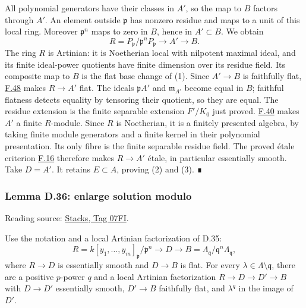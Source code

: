 \documentclass[11pt,a4paper,openany]{report}
\begin{document}
All polynomial generators have their classes in \(A'\), so the map to \(B\) factors through \(A'\). An element outside \(\mathfrak p\) has nonzero residue and maps to a unit of this local ring. Moreover \(\mathfrak p^n\) maps to zero in \(B\), hence in \(A'\subset B\). We obtain \[
R=P_{\mathfrak p}/\mathfrak p^nP_{\mathfrak p}
\longrightarrow A'\longrightarrow B.
\] The ring \(R\) is Artinian: it is Noetherian local with nilpotent maximal ideal, and its finite ideal-power quotients have finite dimension over its residue field. Its composite map to \(B\) is the flat base change of (1). Since \(A'\to B\) is faithfully flat, \hyperref[AG-RG-S05-algebra-lemma-flatness-descends-more-general]{F.48} makes \(R\to A'\) flat. The ideals \(\mathfrak pA'\) and \(\mathfrak m_{A'}\) become equal in \(B\); faithful flatness detects equality by tensoring their quotient, so they are equal. The residue extension is the finite separable extension \(F'/K_0\) just proved. \hyperref[AG-RG-S05-algebra-lemma-essentially-of-finite-type-into-artinian-local]{F.40} makes \(A'\) a finite \(R\)-module. Since \(R\) is Noetherian, it is a finitely presented algebra, by taking finite module generators and a finite kernel in their polynomial presentation. Its only fibre is the finite separable residue field. The proved étale criterion \hyperref[AG-RG-S05-algebra-lemma-characterize-etale]{F.16} therefore makes \(R\to A'\) étale, in particular essentially smooth. Take \(D=A'\). It retains \(E\subset A\), proving (2) and (3). ∎

\label{AG-RG-S05-smoothing-lemma-enlarge-solution-modulo}

\subsubsection{Lemma D.36: enlarge solution modulo}\label{AG-RG-S05-lemma-d.36-enlarge-solution-modulo}

Reading source: \href{https://stacks.math.columbia.edu/tag/07FI}{Stacks, Tag 07FI}.

Use the notation and a local Artinian factorization of D.35: \[
R=k[y_1,\ldots,y_m]_{\mathfrak p}/\mathfrak p^n
\longrightarrow D\longrightarrow
B=\Lambda_{\mathfrak q}/\mathfrak q^n\Lambda_{\mathfrak q},
\] where \(R\to D\) is essentially smooth and \(D\to B\) is flat. For every \(\lambda\in\Lambda\setminus\mathfrak q\), there are a positive \(p\)-power \(q\) and a local Artinian factorization \(R\to D\to D'\to B\) with \(D\to D'\) essentially smooth, \(D'\to B\) faithfully flat, and \(\lambda^q\) in the image of \(D'\).
\end{document}
